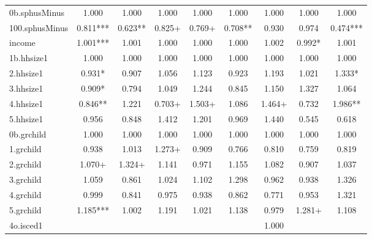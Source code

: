 {\begin{tabular}{l*{8}{c}}
0b.sphusMinus&       1.000   &       1.000   &       1.000   &       1.000   &       1.000   &       1.000   &       1.000   &       1.000   \\
100.sphusMinus&       0.811***&       0.623** &       0.825+  &       0.769+  &       0.708** &       0.930   &       0.974   &       0.474***\\
income      &       1.001***&       1.001   &       1.000   &       1.000   &       1.000   &       1.002   &       0.992*  &       1.001   \\
1b.hhsize1  &       1.000   &       1.000   &       1.000   &       1.000   &       1.000   &       1.000   &       1.000   &       1.000   \\
2.hhsize1   &       0.931*  &       0.907   &       1.056   &       1.123   &       0.923   &       1.193   &       1.021   &       1.333*  \\
3.hhsize1   &       0.909*  &       0.794   &       1.049   &       1.244   &       0.845   &       1.150   &       1.327   &       1.064   \\
4.hhsize1   &       0.846** &       1.221   &       0.703+  &       1.503+  &       1.086   &       1.464+  &       0.732   &       1.986** \\
5.hhsize1   &       0.956   &       0.848   &       1.412   &       1.201   &       0.969   &       1.440   &       0.545   &       0.618   \\
0b.grchild  &       1.000   &       1.000   &       1.000   &       1.000   &       1.000   &       1.000   &       1.000   &       1.000   \\
1.grchild   &       0.938   &       1.013   &       1.273+  &       0.909   &       0.766   &       0.810   &       0.759   &       0.819   \\
2.grchild   &       1.070+  &       1.324+  &       1.141   &       0.971   &       1.155   &       1.082   &       0.907   &       1.037   \\
3.grchild   &       1.059   &       0.861   &       1.024   &       1.102   &       1.298   &       0.962   &       0.938   &       1.326   \\
4.grchild   &       0.999   &       0.841   &       0.975   &       0.938   &       0.862   &       0.771   &       0.953   &       1.321   \\
5.grchild   &       1.185***&       1.002   &       1.191   &       1.021   &       1.138   &       0.979   &       1.281+  &       1.108   \\
4o.isced1   &               &               &               &               &               &       1.000   &               &               \\

\end{tabular}}
